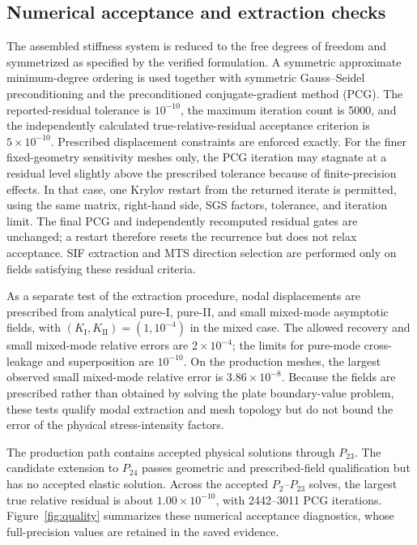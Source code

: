 \documentclass[pdflatex,sn-mathphys-num]{sn-jnl}
\newcommand{\SyntheticRelativeError}{3.86\times10^{-8}}
\newcommand{\MaxTrueResidual}{1.00\times10^{-10}}
\begin{document}
\subsection{Numerical acceptance and extraction checks}
The assembled stiffness system is reduced to the free degrees of
freedom and symmetrized as specified by the verified formulation.
A symmetric approximate minimum-degree ordering is used together
with symmetric Gauss--Seidel preconditioning and the
preconditioned conjugate-gradient method (PCG). The reported-residual
tolerance is $10^{-10}$, the maximum iteration count is 5000, and
the independently calculated true-relative-residual acceptance
criterion is $5\times10^{-10}$. Prescribed displacement
constraints are enforced exactly.
For the finer fixed-geometry sensitivity meshes only, the PCG iteration
may stagnate at a residual level slightly above the prescribed tolerance
because of finite-precision effects. In that case, one Krylov restart
from the returned iterate is permitted, using the
same matrix, right-hand side, SGS factors, tolerance, and iteration limit.
The final PCG and independently recomputed residual gates are unchanged;
a restart therefore resets the recurrence but does not relax acceptance.
SIF extraction and MTS direction selection are performed
only on fields satisfying these residual criteria.

As a separate test of the extraction procedure, nodal
displacements are prescribed from analytical pure-I, pure-II, and
small mixed-mode asymptotic fields, with
$(K_{\mathrm{I}},K_{\mathrm{II}})=(1,10^{-4})$ in the mixed case.
The allowed recovery and small mixed-mode relative errors are
$2\times10^{-4}$; the limits for pure-mode cross-leakage and
superposition are $10^{-10}$. On the production meshes, the largest
observed small mixed-mode relative error is
$\SyntheticRelativeError$. Because the fields are prescribed rather
than obtained by solving the plate boundary-value problem, these
tests qualify modal extraction and mesh topology but do not bound
the error of the physical stress-intensity factors.

The production path contains accepted physical solutions through
$P_{23}$. The candidate extension to $P_{24}$ passes geometric
and prescribed-field qualification but has no accepted elastic
solution. Across the accepted $P_2$--$P_{23}$ solves, the
largest true relative residual is about $\MaxTrueResidual$,
with 2442--3011 PCG iterations. Figure~\ref{fig:quality}
summarizes these numerical acceptance diagnostics, whose
full-precision values are retained in the saved evidence.
\end{document}
